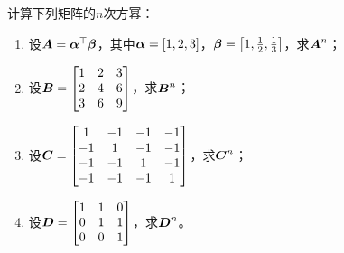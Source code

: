 \begin{problem}\label{problem-1.9}
计算下列矩阵的\(n\)次方幂：

\begin{enumerate}
    \item 设\(\boldsymbol{A}=\boldsymbol{\alpha}^\top\boldsymbol{\beta}\)，其中\(\boldsymbol{\alpha}=\left[ 1,2,3 \right]\)，\(\boldsymbol{\beta}=\left[ 1,\frac{1}{2},\frac{1}{3} \right]\)，求\(\boldsymbol{A}^n\)；
    \item 设\(\boldsymbol{B}=\begin{bmatrix}1&2&3\\2&4&6\\3&6&9\end{bmatrix}\)，求\(\boldsymbol{B}^n\)；
    \item 设\(\boldsymbol{C}=\begin{bmatrix}1&-1&-1&-1\\-1&1&-1&-1\\-1&-1&1&-1\\-1&-1&-1&1\end{bmatrix}\)，求\(\boldsymbol{C}^n\)；
    \item 设\(\boldsymbol{D}=\begin{bmatrix}1&1&0\\0&1&1\\0&0&1\end{bmatrix}\)，求\(\boldsymbol{D}^n\)。
\end{enumerate}
\end{problem}

